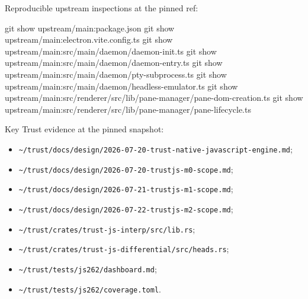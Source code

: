 \documentclass[
  10pt,
  letterpaper,
]{article}
\newenvironment{Shaded}{\begin{snugshade}}{\end{snugshade}}
\newcommand{\FunctionTok}[1]{\textcolor[rgb]{0.02,0.16,0.49}{#1}}
\newcommand{\NormalTok}[1]{#1}
\providecommand{\tightlist}{%
  \setlength{\itemsep}{0pt}\setlength{\parskip}{0pt}}
\begin{document}
Reproducible upstream inspections at the pinned ref:

\begin{Shaded}
\begin{Highlighting}[]
\FunctionTok{git}\NormalTok{ show upstream/main:package.json}
\FunctionTok{git}\NormalTok{ show upstream/main:electron.vite.config.ts}
\FunctionTok{git}\NormalTok{ show upstream/main:src/main/daemon/daemon{-}init.ts}
\FunctionTok{git}\NormalTok{ show upstream/main:src/main/daemon/daemon{-}entry.ts}
\FunctionTok{git}\NormalTok{ show upstream/main:src/main/daemon/pty{-}subprocess.ts}
\FunctionTok{git}\NormalTok{ show upstream/main:src/main/daemon/headless{-}emulator.ts}
\FunctionTok{git}\NormalTok{ show upstream/main:src/renderer/src/lib/pane{-}manager/pane{-}dom{-}creation.ts}
\FunctionTok{git}\NormalTok{ show upstream/main:src/renderer/src/lib/pane{-}manager/pane{-}lifecycle.ts}
\end{Highlighting}
\end{Shaded}

Key Trust evidence at the pinned snapshot:

\begin{itemize}
\tightlist
\item
  \texttt{\textasciitilde{}/trust/docs/design/2026-07-20-trust-native-javascript-engine.md};
\item
  \texttt{\textasciitilde{}/trust/docs/design/2026-07-20-trustjs-m0-scope.md};
\item
  \texttt{\textasciitilde{}/trust/docs/design/2026-07-21-trustjs-m1-scope.md};
\item
  \texttt{\textasciitilde{}/trust/docs/design/2026-07-22-trustjs-m2-scope.md};
\item
  \texttt{\textasciitilde{}/trust/crates/trust-js-interp/src/lib.rs};
\item
  \texttt{\textasciitilde{}/trust/crates/trust-js-differential/src/heads.rs};
\item
  \texttt{\textasciitilde{}/trust/tests/js262/dashboard.md};
\item
  \texttt{\textasciitilde{}/trust/tests/js262/coverage.toml}.
\end{itemize}
\end{document}
